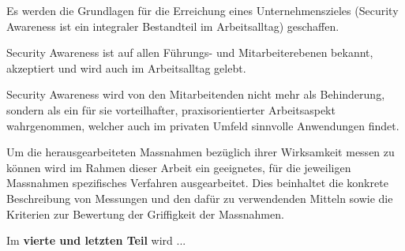 \documentclass[../../main.tex]{subfiles}
\begin{document}
\begin{sloppypar}
Es werden die Grundlagen für die Erreichung eines Unternehmenszieles (Security Awareness ist ein integraler Bestandteil im Arbeitsalltag) geschaffen.

Security Awareness ist auf allen Führungs- und Mitarbeiterebenen bekannt, akzeptiert und wird auch im Arbeitsalltag gelebt.

Security Awareness wird von den Mitarbeitenden nicht mehr als Behinderung, sondern als ein für sie vorteilhafter, praxisorientierter Arbeitsaspekt wahrgenommen, welcher auch im privaten Umfeld sinnvolle Anwendungen findet.

Um die herausgearbeiteten Massnahmen bezüglich ihrer Wirksamkeit messen zu können wird im Rahmen dieser Arbeit ein geeignetes, für die jeweiligen Massnahmen spezifisches Verfahren ausgearbeitet. Dies beinhaltet die konkrete Beschreibung von Messungen und den dafür zu verwendenden Mitteln sowie die Kriterien zur Bewertung der Griffigkeit der Massnahmen.


Im \textbf{vierte und letzten Teil} wird ...

\end{sloppypar}
\end{document}
